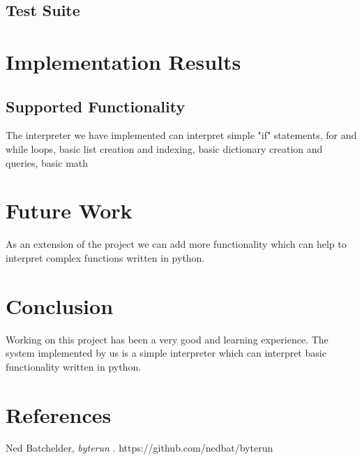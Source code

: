 \documentclass[10pt,a4paper]{article}
\begin{document}
\subsection{Test Suite}

\section{Implementation Results}
\subsection{Supported Functionality}
The interpreter we have implemented can interpret simple "if" statements, for and while loops, basic list creation and indexing, basic dictionary creation and queries, basic math


\section{Future Work}
As an extension of the project we can add more functionality which can help to interpret complex functions written in python.

\section{Conclusion}
Working on this project has been a very good and learning  experience. The system implemented by us is a simple interpreter which can interpret basic functionality written in python.

\section{References} %

\begin{thebibliography}{9}

  Ned Batchelder,
  \emph{byterun }.
  https://github.com/nedbat/byterun


\end{thebibliography}
\end{document}
